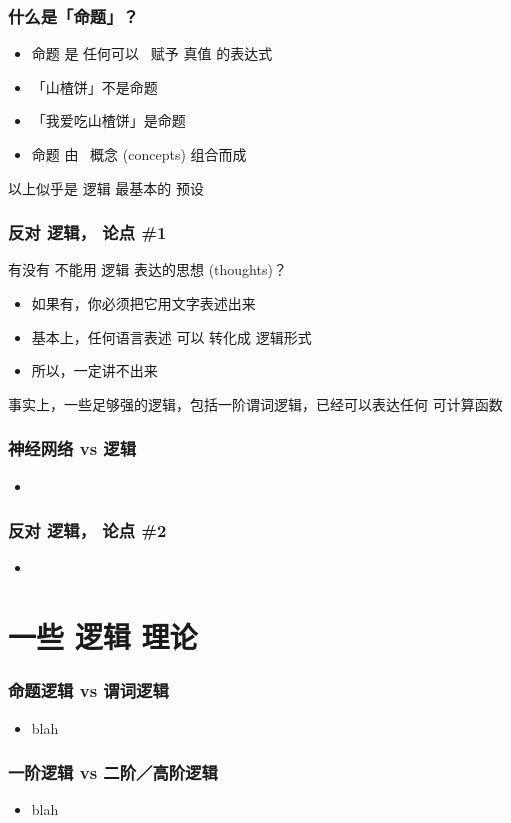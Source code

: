 \documentclass[17pt]{beamer}
\begin{document}
\begin{frame}
\frametitle{什么是「命题」？}
\begin{itemize}
	\item 命题 是 任何可以 {\color{red}\ 赋予 真值} 的表达式
	\item 「山楂饼」不是命题
	\item 「我爱吃山楂饼」是命题
	\item 命题 由 {\color{red}\ 概念} (concepts) 组合而成
\end{itemize}
以上似乎是 逻辑 最基本的 预设
\end{frame}

\begin{frame}
\frametitle{反对 逻辑， 论点 \#1}
有没有 不能用 逻辑 表达的思想 (thoughts)？
\begin{itemize}
\item 如果有，你必须把它用文字表述出来
\item 基本上，任何语言表述 可以 转化成 逻辑形式
\item 所以，一定讲不出来
\end{itemize}
事实上，一些足够强的逻辑，包括一阶谓词逻辑，已经可以表达任何 可计算函数
\end{frame}

\begin{frame}
\frametitle{神经网络 vs 逻辑}
\begin{itemize}
	\item 
\end{itemize}
\end{frame}

\begin{frame}
\frametitle{反对 逻辑， 论点 \#2}

\begin{itemize}
	\item
\end{itemize}
\end{frame}

\section[Section]{一些 逻辑 理论}
\frame{\sectionpage}

\begin{frame}
\frametitle{命题逻辑 vs 谓词逻辑}
\begin{itemize}
	\item blah
\end{itemize}
\end{frame}

\begin{frame}
\frametitle{一阶逻辑 vs 二阶／高阶逻辑}
\begin{itemize}
	\item blah
\end{itemize}
\end{frame}
\end{document}
